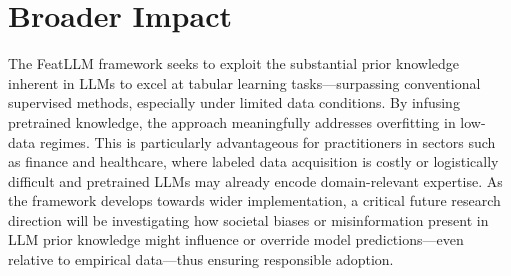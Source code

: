 \section{Broader Impact}
The \textsf{FeatLLM} framework seeks to exploit the substantial prior knowledge inherent in LLMs to excel at tabular learning tasks—surpassing conventional supervised methods, especially under limited data conditions. By infusing pretrained knowledge, the approach meaningfully addresses overfitting in low-data regimes. This is particularly advantageous for practitioners in sectors such as finance and healthcare, where labeled data acquisition is costly or logistically difficult and pretrained LLMs may already encode domain-relevant expertise. As the framework develops towards wider implementation, a critical future research direction will be investigating how societal biases or misinformation present in LLM prior knowledge might influence or override model predictions—even relative to empirical data—thus ensuring responsible adoption.

